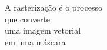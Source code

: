 \documentclass[preview]{standalone}
\begin{document}
A rasterização é o processo\\que converte\\uma imagem vetorial\\em uma máscara\\
\end{document}
